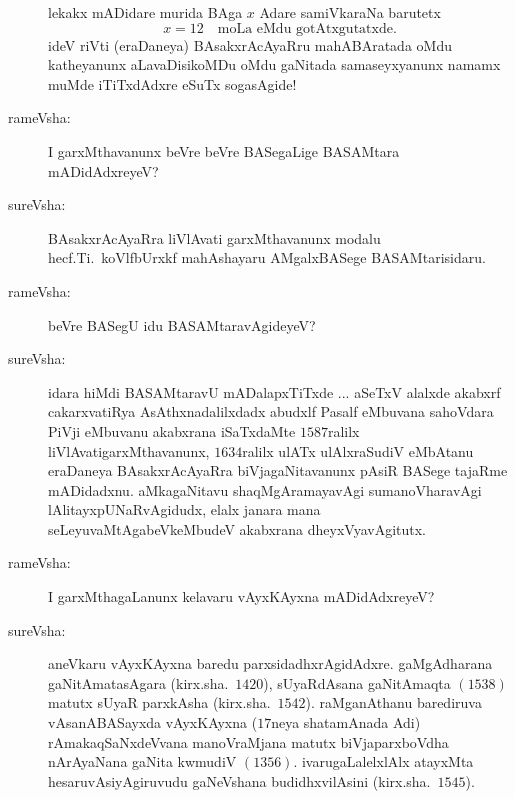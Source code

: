 \begin{description}
lekakx mADidare murida BAga $x$ Adare samiVkaraNa barutetx
$$
x=12\text{~~ moLa eMdu gotAtxgutatxde.}
$$
ideV riVti (eraDaneya) BAsakxrAcAyaRru mahABAratada oMdu katheyanunx aLavaDisikoMDu oMdu gaNitada samaseyxyanunx namamx muMde iTiTxdAdxre eSuTx sogasAgide!

\item[rameVsha:] I garxMthavanunx beVre beVre BASegaLige BASAMtara mADidAdxreyeV?

\item[sureVsha:] BAsakxrAcAyaRra liVlAvati garxMthavanunx modalu hecf.Ti.\ koVlfbUrxkf mahAshayaru AMgalxBASege BASAMtarisidaru.

\item[rameVsha:] beVre BASegU idu BASAMtaravAgideyeV?

\item[sureVsha:] idara hiMdi BASAMtaravU mADalapxTiTxde ... aSeTxV alalxde akabxrf cakarxvatiRya AsAthxnadalilxdadx abudxlf Pasalf eMbuvana sahoVdara PiVji eMbuvanu akabxrana iSaTxdaMte $1587$ralilx liVlAvatigarxMthavanunx, $1634$ralilx ulATx ulAlxraSudiV eMbAtanu eraDaneya BAsakxrAcAyaRra biVjagaNitavanunx pAsiR BASege tajaRme mADidadxnu. aMkagaNitavu shaqMgAramayavAgi sumanoVharavAgi lAlitayxpUNaRvAgidudx, elalx janara mana seLeyuvaMtAgabeVkeMbudeV akabxrana dheyxVyavAgitutx.

\item[rameVsha:] I garxMthagaLanunx kelavaru vAyxKAyxna mADidAdxreyeV?

\item[sureVsha:] aneVkaru vAyxKAyxna baredu parxsidadhxrAgidAdxre. gaMgAdharana gaNitAmatasAgara (kirx.sha.\ $1420$), sUyaRdAsana gaNitAmaqta $(1538)$ matutx sUyaR parxkAsha (kirx.sha.\ $1542$). raMganAthanu barediruva vAsanABASayxda vAyxKAyxna ($17$neya shatamAnada Adi) rAmakaqSaNxdeVvana manoVraMjana matutx biVjaparxboVdha nArAyaNana gaNita kwmudiV $(1356)$. ivarugaLalelxlAlx atayxMta hesaruvAsiyAgiruvudu gaNeVshana budidhxvilAsini (kirx.sha.\ $1545$).
\end{description}
